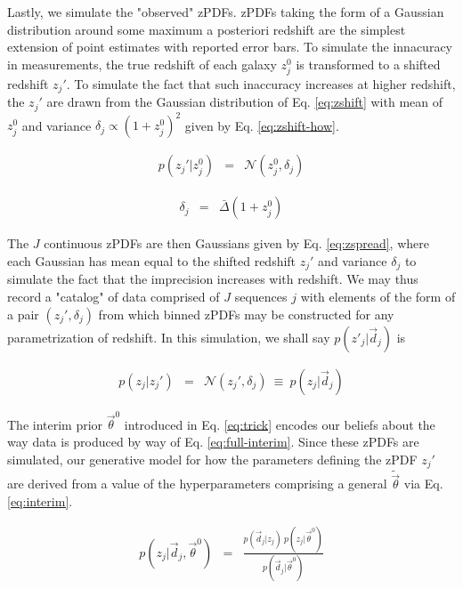 \documentclass[preprint]{aastex}
\begin{document}
Lastly, we simulate the "observed" zPDFs.  zPDFs taking the form of a Gaussian distribution around some maximum a posteriori redshift are the simplest extension of point estimates with reported error bars.  To simulate the innacuracy in measurements, the true redshift of each galaxy $z_{j}^{0}$ is transformed to a shifted redshift $z_{j}'$.  To simulate the fact that such inaccuracy increases at higher redshift, the $z_{j}'$ are drawn from the Gaussian distribution of Eq. \ref{eq:zshift} with mean of $z_{j}^{0}$ and variance $\delta_{j}\propto(1+z_{j}^{0})^{2}$ given by Eq. \ref{eq:zshift-how}.  

\begin{eqnarray}
\label{eq:zshift}
p(z_{j}'|z^{0}_{j}) &=& \mathcal{N}(z_{j}^{0},\delta_{j})
\end{eqnarray}

\begin{eqnarray}
\label{eq:zshift-how}
\delta_{j} &=& \bar{\Delta}(1+z^{0}_{j})
\end{eqnarray}

The $J$ continuous zPDFs are then Gaussians given by Eq. \ref{eq:zspread}, where each Gaussian has mean equal to the shifted redshift $z_{j}'$ and variance $\delta_{j}$ to simulate the fact that the imprecision increases with redshift.  We may thus record a "catalog" of data comprised of $J$ sequences $j$ with elements of the form of a pair $(z_{j}',\delta_{j})$ from which binned zPDFs may be constructed for any parametrization of redshift.  In this simulation, we shall say $p(z'_{j}|\vec{d}_{j})$ is

\begin{eqnarray}
\label{eq:zspread}
p(z_{j}|z_{j}') &=& \mathcal{N}(z_{j}',\delta_{j})\ \equiv\ p(z_{j}|\vec{d}_{j})
\end{eqnarray}

The interim prior $\vec{\theta}^{0}$ introduced in Eq. \ref{eq:trick} encodes our beliefs about the way data is produced by way of Eq. \ref{eq:full-interim}.  Since these zPDFs are simulated, our generative model for how the parameters defining the zPDF $z_{j}'$ are derived from a value of the hyperparameters comprising a general $\tilde{\vec{\theta}}$ via Eq. \ref{eq:interim}.  

\begin{eqnarray}
\label{eq:full-interim}
p(z_{j}|\vec{d}_{j},\vec{\theta}^{0}) &=& \frac{p(\vec{d}_{j}|z_{j})\ p(z_{j}|\vec{\theta}^{0})}{p(\vec{d}_{j}|\vec{\theta}^{0})}
\end{eqnarray}
\end{document}

